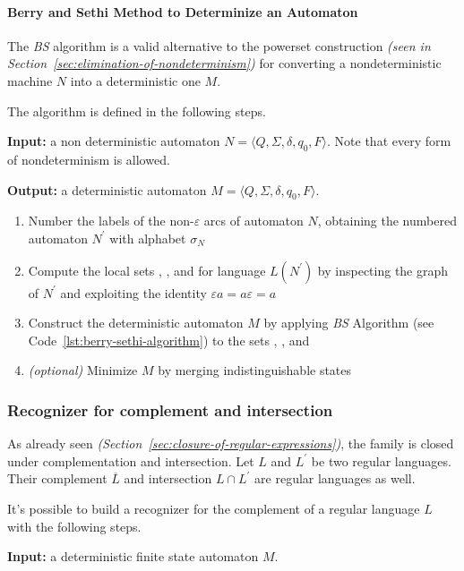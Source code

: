 \documentclass[english]{article}
\begin{document}
\paragraph{Berry and Sethi Method to Determinize an Automaton}
The \textit{BS} algorithm is a valid alternative to the powerset construction \textit{(seen in Section~\ref{sec:elimination-of-nondeterminism})}
for converting a nondeterministic machine \(N\) into a deterministic one \(M\).

The algorithm is defined in the following steps.

\bigskip
\textbf{Input:}
a non deterministic automaton \(N = \langle Q, \Sigma, \delta, q_0, F \rangle\).
Note that every form of nondeterminism is allowed.

\textbf{Output:}
a deterministic automaton \(M = \langle Q, \Sigma, \delta, q_0, F \rangle\).

\begin{enumerate}
  \item Number the labels of the non-\(\varepsilon\) arcs of automaton \(N\), obtaining the numbered automaton \(N^\prime\) with alphabet \(\sigma_N\)
  \item Compute the local sets \Ini, \Fin, and \Fol for language \(L(N^\prime)\) by inspecting the graph of \(N^\prime\) and exploiting the identity \(\varepsilon a = a \varepsilon = a\)
  \item Construct the deterministic automaton \(M\) by applying \textit{BS} Algorithm (see Code~\ref{lst:berry-sethi-algorithm}) to the sets \Ini, \Fin, and \Fol
  \item \textit{(optional)} Minimize \(M\) by merging indistinguishable states
\end{enumerate}

\subsubsection{Recognizer for complement and intersection}

As already seen \textit{(Section~\ref{sec:closure-of-regular-expressions})}, the \REG family is closed under complementation and intersection.
Let \(L\) and \(L^\prime\) be two regular languages. Their complement \(\overline{L}\) and intersection \(L \cap L^\prime\) are regular languages as well.

It's possible to build a recognizer for the complement of a regular language \(L\) with the following steps.

\bigskip
\textbf{Input:}
a deterministic finite state automaton \(M\).
\end{document}
